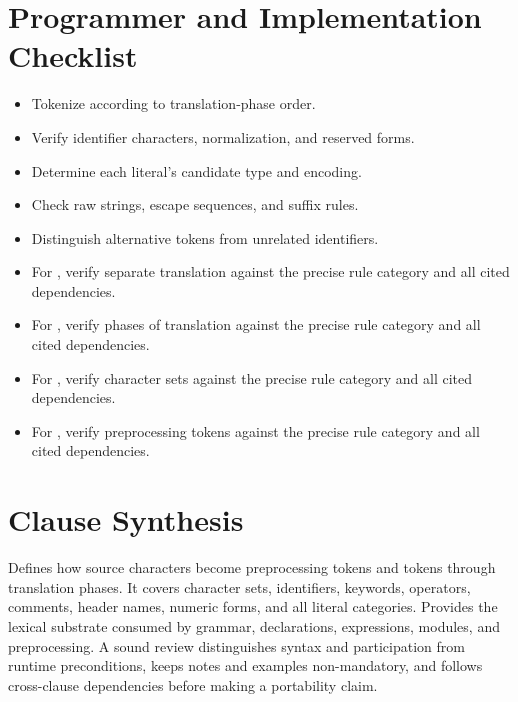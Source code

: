 \documentclass[11pt,letterpaper]{article}
\begin{document}
\section{Programmer and Implementation Checklist}
\begin{CornellReferenceChecklistBox}\begin{itemize}[label=$\square$]
\item Tokenize according to translation-phase order.
\item Verify identifier characters, normalization, and reserved forms.
\item Determine each literal's candidate type and encoding.
\item Check raw strings, escape sequences, and suffix rules.
\item Distinguish alternative tokens from unrelated identifiers.
\item For , verify separate translation against the precise rule category and all cited dependencies.
\item For , verify phases of translation against the precise rule category and all cited dependencies.
\item For , verify character sets against the precise rule category and all cited dependencies.
\item For , verify preprocessing tokens against the precise rule category and all cited dependencies.
\end{itemize}\end{CornellReferenceChecklistBox}
\section{Clause Synthesis}
\begin{CornellReferenceOrientationBox}Defines how source characters become preprocessing tokens and tokens through translation phases. It covers character sets, identifiers, keywords, operators, comments, header names, numeric forms, and all literal categories. Provides the lexical substrate consumed by grammar, declarations, expressions, modules, and preprocessing. A sound review distinguishes syntax and participation from runtime preconditions, keeps notes and examples non-mandatory, and follows cross-clause dependencies before making a portability claim.\end{CornellReferenceOrientationBox}
\end{document}

